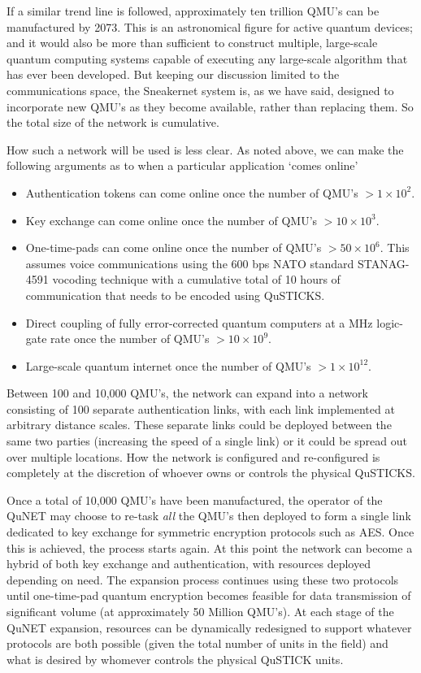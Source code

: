 \documentclass[twocolumn, aps, rmp, amsmath, amssymb, nofootinbib, superscriptaddress, longbibliography, floatfix, table-of-contents, eqsecnum]{revtex4-2}
\begin{document}
If a similar trend line is followed, approximately ten trillion QMU's can be manufactured by 2073. This is an astronomical figure for active quantum devices; and it would also be more than sufficient to construct multiple, large-scale quantum computing systems capable of executing any large-scale algorithm that has ever been developed. But keeping our discussion limited to the communications space, the Sneakernet system is, as we have said, designed to incorporate new QMU's as they become available, rather than replacing them. So the total size of the network is cumulative. 

How such a network will be used is less clear. As noted above, we can make the following arguments as to when a particular application `comes online'
\begin{itemize}
\item Authentication tokens can come online once the number of QMU's $> 1\times 10^2$. 
\item Key exchange can come online once the number of QMU's $> 10\times 10^3$.
\item One-time-pads can come online once the number of QMU's $> 50\times 10^6$. This assumes voice communications using the 600 bps NATO standard STANAG-4591 vocoding technique with a cumulative total of 10 hours of communication that needs to be encoded using QuSTICKS.
\item Direct coupling of fully error-corrected quantum computers at a MHz logic-gate rate once the number of QMU's $> 10\times 10^9$. 
\item Large-scale quantum internet once the number of QMU's $> 1\times 10^{12}$.
\end{itemize}

Between 100 and 10,000 QMU's, the network can expand into a network consisting of 100 separate authentication links, with each link implemented at arbitrary distance scales. These separate links could be deployed between the same two parties (increasing the speed of a single link) or it could be spread out over multiple locations. How the network is configured and re-configured is completely at the discretion of whoever owns or controls the physical QuSTICKS. 

Once a total of 10,000 QMU's have been manufactured, the operator of the QuNET may choose to re-task \textit{all} the QMU's then deployed to form a single link dedicated to key exchange for symmetric encryption protocols such as AES. Once this is achieved, the process starts again. At this point the network can become a hybrid of both key exchange and authentication, with resources deployed depending on need. The expansion process continues using these two protocols until one-time-pad quantum encryption becomes feasible for data transmission of significant volume (at approximately 50 Million QMU's). At each stage of the QuNET expansion, resources can be dynamically redesigned to support whatever protocols are both possible (given the total number of units in the field) and what is desired by whomever controls the physical QuSTICK units. 
\end{document}
